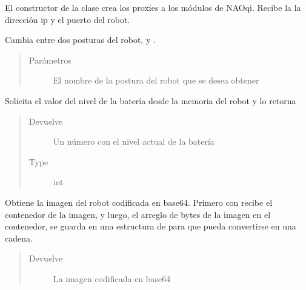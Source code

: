 \begin{fulllineitems}
El constructor de la clase crea los proxies a los módulos de NAOqi.
Recibe la la dirección ip y el puerto del robot.

\begin{fulllineitems}
\label{\detokenize{nao_firebase:nao_robot.Robot.change_posture}}
Cambia entre dos posturas del robot,  y .
\begin{quote}\begin{description}
\item[{Parámetros}] \leavevmode
{} \textendash{} El nombre de la postura del robot que se desea obtener

\end{description}\end{quote}

\end{fulllineitems}


\begin{fulllineitems}
\label{\detokenize{nao_firebase:nao_robot.Robot.get_battery_level}}
Solicita el valor del nivel de la batería desde la memoria del robot
y lo retorna
\begin{quote}\begin{description}
\item[{Devuelve}] \leavevmode
Un número con el nivel actual de la batería

\item[{Type}] \leavevmode
int

\end{description}\end{quote}

\end{fulllineitems}


\begin{fulllineitems}
\label{\detokenize{nao_firebase:nao_robot.Robot.get_image_from_robot}}
Obtiene la imagen del robot codificada en base64. Primero con
 recibe el contenedor de la imagen, y luego,
el arreglo de bytes de la imagen en el contenedor, se guarda en una
estructura de  para que pueda convertirse en una cadena.
\begin{quote}\begin{description}
\item[{Devuelve}] \leavevmode
La imagen codificada en base64


\end{description}
\end{quote}
\end{fulllineitems}
\end{fulllineitems}
